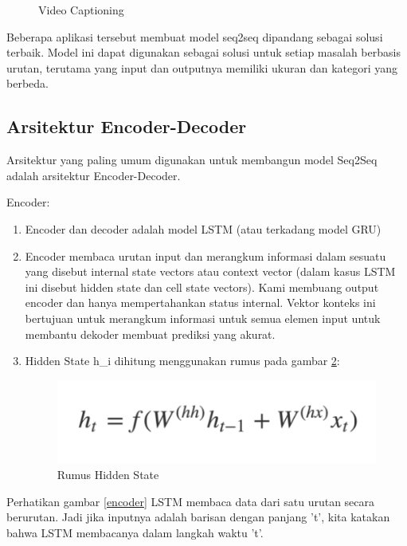 \begin{enumerate}
\begin{figure}[H]
        \caption{Video Captioning}
		\label{video}
\end{figure}
\end{enumerate}

Beberapa aplikasi tersebut membuat model seq2seq dipandang sebagai solusi terbaik. Model ini dapat digunakan sebagai solusi untuk setiap masalah berbasis urutan, terutama yang input dan outputnya memiliki ukuran dan kategori yang berbeda.

\subsection{Arsitektur Encoder-Decoder}
Arsitektur yang paling umum digunakan untuk membangun model Seq2Seq adalah arsitektur Encoder-Decoder.

Encoder:
\begin{enumerate}
\item Encoder dan decoder adalah model LSTM (atau terkadang model GRU)
\item Encoder membaca urutan input dan merangkum informasi dalam sesuatu yang disebut internal state vectors atau context vector (dalam kasus LSTM ini disebut hidden state dan cell state vectors). Kami membuang output encoder dan hanya mempertahankan status internal. Vektor konteks ini bertujuan untuk merangkum informasi untuk semua elemen input untuk membantu dekoder membuat prediksi yang akurat.
\item Hidden State h\_i dihitung menggunakan rumus pada gambar \ref{rumus}:
\begin{figure}[H]
        \centerline{\includegraphics[scale=.3]{figures/rumus}}
        \caption{Rumus Hidden State}
		\label{rumus}
\end{figure}
\end{enumerate}

Perhatikan gambar \ref{encoder} LSTM membaca data dari satu urutan secara berurutan. Jadi jika inputnya adalah barisan dengan panjang 't', kita katakan bahwa LSTM membacanya dalam langkah waktu 't'.


